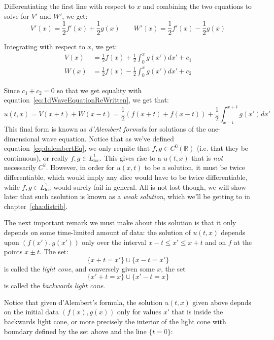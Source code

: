 \documentclass{book}
\newcommand{\R}{{\mathbb{R}}}
\begin{document}
Differentiating the first line with respect to $x$ and combining the two equations to solve for $V'$ and $W'$, we get:
\[
	V'(x) = \frac{1}{2}f'(x) + \frac{1}{2}g(x) \qquad W'(x) = \frac{1}{2}f'(x) - \frac{1}{2}g(x)
\]

Integrating with respect to $x$, we get:
\begin{align*}
	V(x) &= \frac{1}{2}f(x) + \frac{1}{2}\int_0^x g(x')dx' + c_1\\
	W(x) &= \frac{1}{2}f(x) - \frac{1}{2}\int_0^x g(x')dx' + c_2
\end{align*}

Since $c_1 + c_2 = 0$ so that we get equality with equation~\ref{eq:1dWaveEquationReWritten}, we get that:
\begin{equation}\label{eq:dalembertEq}
	u(t,x) = V(x+t) + W(x-t) = \frac{1}{2}\left(f(x+t)+f(x-t)\right) + \frac{1}{2}\int_{x-t}^{x+t} g(x')dx'
\end{equation}
This final form is known as \emph{d'Alembert formula} for solutions of the one-dimensional wave equation.
Notice that
as we've defined equation~\ref{eq:dalembertEq}, we only requite that $f,g \in C^0(\R)$ (i.e. that they be continuous),
or really $f,g \in L_{\text{loc}}^1$.
This gives rise to a $u(t,x)$ that is \emph{not} necessarily $C^2$. However, in order for $u(x,t)$ to be a solution, it
must be twice differentiable, which would imply any slice would have to be twice differentiable, while $f,g \in
L_{\text{loc}}^1$ would surely fail in general. All is not lost though, we will show later that such asolution is known
as a \emph{weak solution}, which we'll be getting to in chapter~\ref{cha:distrib}.

The next important remark we must make about this solution is that it only depends on some time-limited amount of data:
the solution of $u(t,x)$ depends upon $(f(x'), g(x'))$ only over the interval $x-t \le x' \le x+t$ and on $f$ at the
points $x\pm t$. The set:
\[
	\{x+t = x'\} \cup \{x-t = x'\}
\]
is called the \emph{light cone}, and conversely given some $x$, the set
\[
	\{x'+t = x\} \cup \{x'-t = x\}
\]
is called the \emph{backwards light cone}.


Notice that given d'Alembert's formula, the solution $u(t,x)$ given above depnds on the initial data $(f(x), g(x))$ only
for values $x'$ that is inside the backwards light cone, or more precisely the interior of the light cone with boundary
defined by the set above and the line $\{t = 0\}$:
\end{document}
